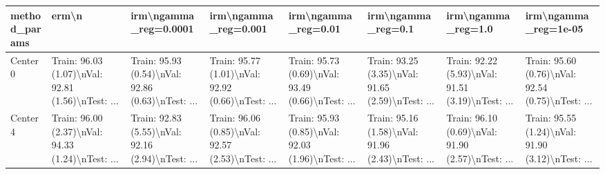\begin{tabular}{llllllll}
\toprule
method\_params &                                              erm\textbackslash n &                              irm\textbackslash ngamma\_reg=0.0001 &                               irm\textbackslash ngamma\_reg=0.001 &                                irm\textbackslash ngamma\_reg=0.01 &                                 irm\textbackslash ngamma\_reg=0.1 &                                 irm\textbackslash ngamma\_reg=1.0 &                               irm\textbackslash ngamma\_reg=1e-05 \\
\midrule
Center 0 &  Train: 96.03 (1.07)\textbackslash nVal: 92.81 (1.56)\textbackslash nTest: ... &  Train: 95.93 (0.54)\textbackslash nVal: 92.86 (0.63)\textbackslash nTest: ... &  Train: 95.77 (1.01)\textbackslash nVal: 92.92 (0.66)\textbackslash nTest: ... &  Train: 95.73 (0.69)\textbackslash nVal: 93.49 (0.66)\textbackslash nTest: ... &  Train: 93.25 (3.35)\textbackslash nVal: 91.65 (2.59)\textbackslash nTest: ... &  Train: 92.22 (5.93)\textbackslash nVal: 91.51 (3.19)\textbackslash nTest: ... &  Train: 95.60 (0.76)\textbackslash nVal: 92.54 (0.75)\textbackslash nTest: ... \\
Center 4 &  Train: 96.00 (2.37)\textbackslash nVal: 94.33 (1.24)\textbackslash nTest: ... &  Train: 92.83 (5.55)\textbackslash nVal: 92.16 (2.94)\textbackslash nTest: ... &  Train: 96.06 (0.85)\textbackslash nVal: 92.57 (2.53)\textbackslash nTest: ... &  Train: 95.93 (0.85)\textbackslash nVal: 92.03 (1.96)\textbackslash nTest: ... &  Train: 95.16 (1.58)\textbackslash nVal: 91.96 (2.43)\textbackslash nTest: ... &  Train: 96.10 (0.69)\textbackslash nVal: 91.90 (2.57)\textbackslash nTest: ... &  Train: 95.55 (1.24)\textbackslash nVal: 91.90 (3.12)\textbackslash nTest: ... \\
\bottomrule
\end{tabular}
